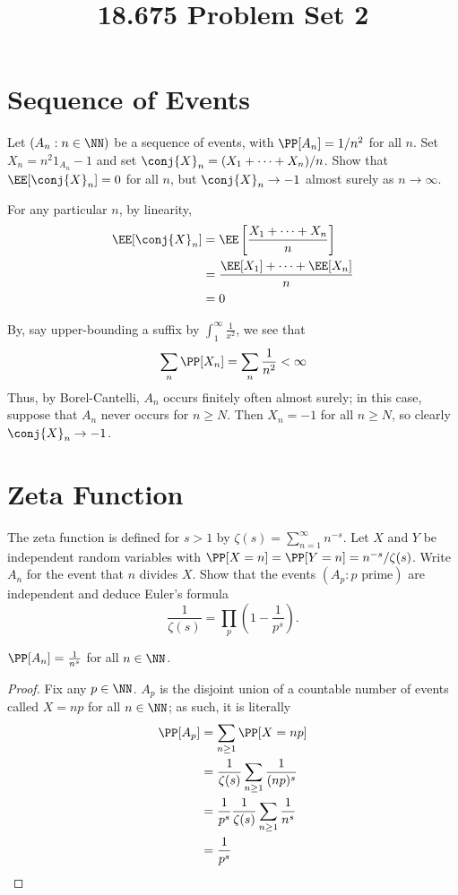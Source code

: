 \documentclass[11pt, headheight=30pt]{scrartcl}
\title{18.675 Problem Set 2}
\begin{document}
\section{Sequence of Events}
\begin{prob}
    Let $(A_n : n \in \NN)$ be a sequence of events,
    with $\PP[A_n] = 1/n^2$ for all $n$. Set
    $X_n = n^2 1_{A_n} - 1$ and set $\conj{X}_n = (X_1 + \cdots + X_n)/n$.
    Show that $\EE[\conj{X}_n] = 0$ for all $n$, but $\conj{X}_n \to -1$ almost surely
    as $n \to \infty$.
\end{prob}

For any particular $n$, by linearity,
\begin{align*}
    \EE[\conj{X}_n] &= \EE\left[\frac{X_1 + \cdots + X_n}{n}\right]\\
    &= \frac{\EE[X_1] + \cdots + \EE[X_n]}{n}\\
    &= 0
\end{align*}

By, say upper-bounding a suffix by $\int_1^\infty \frac{1}{x^2}$, we see that
\[
    \sum_n \PP[X_n] = \sum_n \frac{1}{n^2} < \infty    
\]
Thus, by Borel-Cantelli, $A_n$ occurs finitely often almost surely; in
this case, suppose that $A_n$ never occurs for $n \geq N$. Then
$X_n = -1$ for all $n\geq N$, so clearly $\conj{X}_n\to -1$.

\section{Zeta Function}
\begin{prob}
    The zeta function is defined for $s > 1$ by $\zeta(s) = \sum_{n=1}^\infty n^{-s}$.
    Let $X$ and $Y$ be independent random variables with
    $\PP[X = n] = \PP[Y = n] = n^{-s}/\zeta(s)$.
    Write $A_n$ for the event that $n$ divides $X$. Show that the events
    $(A_p : p \text{ prime})$ are independent
    and deduce Euler's formula
    \[
        \frac{1}{\zeta(s)} = \prod_p \left(1 - \frac{1}{p^s}\right).
    \]
\end{prob}
\begin{claim*}
    $\PP[A_n] = \frac{1}{n^s}$ for all $n\in \NN$.
\end{claim*}
\begin{proof}
    Fix any $p\in \NN$. $A_p$ is the disjoint union
    of a countable number of events called $X = np$ for all $n\in \NN$;
    as such, it is literally
    \begin{align*}
        \PP[A_p] &= \sum_{n\geq 1} \PP[X = np]\\
        &= \frac{1}{\zeta(s)}\sum_{n\geq 1} \frac{1}{(np)^s}\\
        &= \frac{1}{p^s}\frac{1}{\zeta(s)}\sum_{n\geq 1} \frac{1}{n^s}\\
        &= \frac{1}{p^s}
    \end{align*}
\end{proof}
\end{document}
